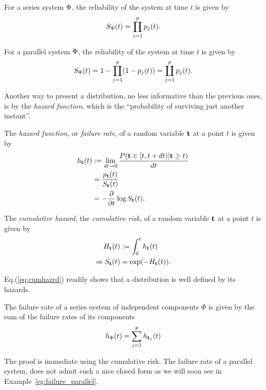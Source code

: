 \begin{example}
For a series system $\Phi$, the reliability of the system at time $t$ is given by $$S_{\Phi} (t)=\prod_{j=1}^{p} p_j(t).$$
\end{example}


\begin{example}
For a parallel system $\Phi$, the reliability of the system at time $t$ is given by $$S_{\Phi} (t)=1- \prod_{j=1}^{p} (1-p_j(t))= \coprod_{j=1}^p p_j(t).$$
\end{example}





Another way to present a distribution, no less informative than the previous ones, is by the \emph{hazard function}, which is the ``probability of surviving just another instant''.
\begin{definition}
The \emph{hazard function}, or \emph{failure rate}, of a random variable $\mathbf{t}$ at a point $t$ is given by 
\begin{align}
	h_{\mathbf{t}} (t) &:= \lim_{dt\to 0}\frac{P( \mathbf{t} \in [t,t+dt)|\mathbf{t} \geq t )}{dt} \label{eq:hazard}\\
	&= \frac{p_{\mathbf{t}} (t)}{S_{\mathbf{t}} (t)} \\
	&= - \frac{\partial}{\partial t}\log S_{\mathbf{t}} (t) . \label{eq:survival_to_hazard}
\end{align}
\end{definition}





\begin{definition}
The \emph{cumulative hazard}, \aka the \emph{cumulative risk}, of a random variable $\mathbf{t}$ at a point $t$ is given by 
\begin{align}
	H_{\mathbf{t}} (t) &:= \int_{0}^{t}h_{\mathbf{t}} (t) \\
	\Rightarrow S_{\mathbf{t}} (t) &= \exp(-H_{\mathbf{t}} (t)). \label{eq:cumhazrd}
\end{align}
\end{definition}
Eq.(\ref{eq:cumhazrd}) readily shows that a distribution is well defined by its hazards.



\begin{theorem}
\label{thm:ifr_closure}
The failure rate of a series system of independent components $\Phi$ is given by the sum of the failure rates of its components
\begin{align}
	h_{\Phi} (t)= \sum_{j=1}^{p} h_{\mathbf{t}_j} (t)
\end{align}
\end{theorem}
The proof is immediate using the cumulative risk.
The failure rate of a parallel system, does not admit such a nice closed form as we will soon see in Example~\ref{eg:failure_parallel}.




